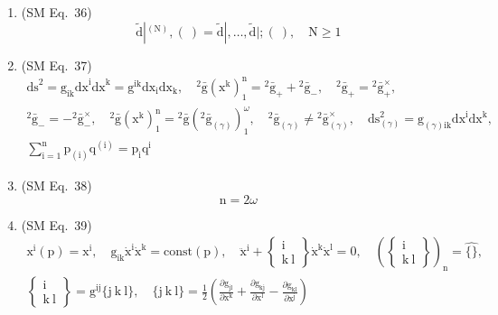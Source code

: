 \documentclass[12pt]{article}
\begin{document}
\begin{enumerate}[label=(\arabic*), series=formellist]
    \item (SM Eq.\ 36) 
    \[
    \tilde{\mathrm{d}}|^{(\mathrm{N})}, (\ ) = \tilde{\mathrm{d}}|, \dots, \tilde{\mathrm{d}}|; (\ ), \quad \mathrm{N} \ge 1
    \]

    \item (SM Eq.\ 37) 
    \[
    \begin{gathered} 
    \mathrm{ds}^2 = \mathrm{g}_{\mathrm{ik}} \mathrm{dx}^\mathrm{i} \mathrm{dx}^\mathrm{k} = \mathrm{g}^{\mathrm{ik}} \mathrm{dx}_\mathrm{i} \mathrm{dx}_\mathrm{k}, \quad {}^2\bar{\mathrm{g}}(\mathrm{x^k})_1^\mathrm{n} = {}^2\bar{\mathrm{g}}_+ + {}^2\bar{\mathrm{g}}_-, \quad {}^2\bar{\mathrm{g}}_+ = {}^2\bar{\mathrm{g}}_+^\times, \\ 
    {}^2\bar{\mathrm{g}}_- = -{}^2\bar{\mathrm{g}}_-^\times, \quad {}^2\bar{\mathrm{g}}(\mathrm{x^k})_1^\mathrm{n} = {}^2\bar{\mathrm{g}}({}^2\bar{\mathrm{g}}_{(\gamma)})_1^\omega, \quad {}^2\bar{\mathrm{g}}_{(\gamma)} \ne {}^2\bar{\mathrm{g}}_{(\gamma)}^\times, \quad \mathrm{ds}_{(\gamma)}^2 = \mathrm{g}_{(\gamma)\mathrm{ik}} \mathrm{dx}^\mathrm{i} \mathrm{dx}^\mathrm{k}, \\ 
    \sum_{\mathrm{i}=1}^\mathrm{n} \mathrm{p}_{(\mathrm{i})} \mathrm{q}^{(\mathrm{i})} = \mathrm{p_i} \mathrm{q^i} 
    \end{gathered}
    \]

    \item (SM Eq.\ 38) 
    \[
    \mathrm{n} = 2\omega
    \]

    \item (SM Eq.\ 39) 
    \[
    \begin{gathered}
    \mathrm{x^i}(\mathrm{p}) = \mathrm{x^i}, \quad \mathrm{g}_{\mathrm{ik}} \dot{\mathrm{x}}^\mathrm{i} \dot{\mathrm{x}}^\mathrm{k} = \mathrm{const}(\mathrm{p}), \quad \ddot{\mathrm{x}}^\mathrm{i} + \left\{ \begin{smallmatrix} \mathrm{i} \\ \mathrm{k\ l} \end{smallmatrix} \right\} \dot{\mathrm{x}}^\mathrm{k} \dot{\mathrm{x}}^\mathrm{l} = 0, \quad \left( \left\{ \begin{smallmatrix} \mathrm{i} \\ \mathrm{k\ l} \end{smallmatrix} \right\} \right)_\mathrm{n} = \widehat{\{\}}, \\
    \left\{ \begin{smallmatrix} \mathrm{i} \\ \mathrm{k\ l} \end{smallmatrix} \right\} = \mathrm{g}^{\mathrm{ij}} \{ \mathrm{j\ k\ l} \}, \quad \{ \mathrm{j\ k\ l} \} = \frac{1}{2}\left( \frac{\partial \mathrm{g}_{\mathrm{jl}}}{\partial \mathrm{x^k}} + \frac{\partial \mathrm{g}_{\mathrm{kj}}}{\partial \mathrm{x^l}} - \frac{\partial \mathrm{g}_{\mathrm{kl}}}{\partial \mathrm{x^j}} \right)
    \end{gathered}
    \]


\end{enumerate}
\end{document}
